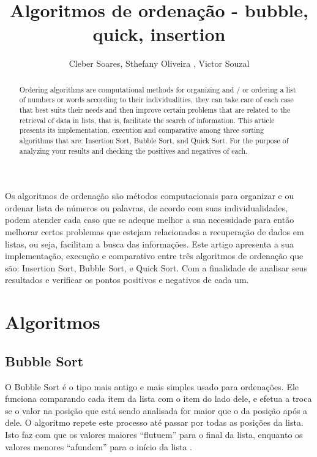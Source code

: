 \documentclass[12pt]{article}
\title{Algoritmos de ordenação - bubble, quick, insertion}
\author{Cleber Soares\inst{1},  Sthefany Oliveira \inst{1}, Victor Souzal\inst{1} }
\begin{document}
 

\maketitle

\begin{abstract}
  Ordering algorithms are computational methods for organizing and / or ordering a list of numbers or words according to their individualities, they can take care of each case that best suits their needs and then improve certain problems that are related to the retrieval of data in lists, that is, facilitate the search of information. This article presents its implementation, execution and comparative among three sorting algorithms that are: Insertion Sort, Bubble Sort, and Quick Sort. For the purpose of analyzing your results and checking the positives and negatives of each.
\end{abstract}
     
\begin{resumo} 
  Os algoritmos de ordenação são métodos computacionais para organizar e ou ordenar lista de números ou palavras, de acordo com suas individualidades, podem atender cada caso que se adeque melhor a sua necessidade para então melhorar certos problemas que estejam relacionados a recuperação de dados em listas, ou seja, facilitam a busca das informações. Este artigo apresenta a sua implementação, execução e comparativo entre três algoritmos de ordenação que são: Insertion Sort, Bubble Sort, e Quick Sort. Com a finalidade de analisar seus resultados e verificar os pontos positivos e negativos de cada um.
\end{resumo}	


	
\section{Algoritmos}

\subsection{Bubble Sort}

O Bubble Sort é o tipo mais antigo e mais simples usado para ordenações. Ele
funciona comparando cada item da lista com o item do lado dele, e efetua a troca se o
valor na posição que está sendo analisada for maior que o da posição após a dele. O
algoritmo repete este processo até passar por todas as posições da lista. Isto faz com que
os valores maiores “flutuem” para o final da lista, enquanto os valores menores “afundem”
para o início da lista \cite{da2016analise}.
	
\end{document}
